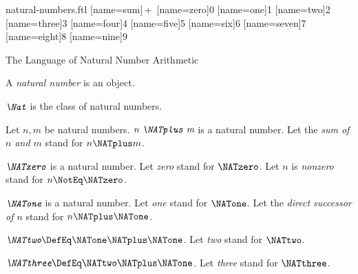 \documentclass{stex}
\begin{document}
\begin{smodule}{natural-numbers.ftl}
[name=sum]{\,+\,}
[name=zero]{0}
[name=one]{1}
[name=two]{2}
[name=three]{3}
[name=four]{4}
[name=five]{5}
[name=six]{6}
[name=seven]{7}
[name=eight]{8}
[name=nine]{9}

\begin{sfragment}{The Language of Natural Number Arithmetic}
  \begin{signature}[forthel,for=natural number]
    A \emph{natural number} is an object.
  \end{signature}

  \begin{definition}[forthel,for=Nat]
    $\emph{\Nat}$ is the class of natural numbers.
  \end{definition}

  \begin{signature}[forthel,for=sum]
    Let $n, m$ be natural numbers.
    $\emph{n \NATplus m}$ is a natural number.
    Let the \emph{sum of $n$ and $m$} stand for $n \NATplus m$.
  \end{signature}

  \begin{signature}[forthel,for={zero,nonzero}]
    $\emph{\NATzero}$ is a natural number.
    Let \emph{zero} stand for $\NATzero$.
    Let $n$ is \emph{nonzero} stand for $n \NotEq \NATzero$.
  \end{signature}

  \begin{signature}[forthel,for={one,direct successor}]
    $\emph{\NATone}$ is a natural number.
    Let \emph{one} stand for $\NATone$.
    Let the \emph{direct successor of $n$} stand for $n \NATplus \NATone$.
  \end{signature}

  \begin{definition}[forthel,for=two]
    $\emph{\NATtwo} \DefEq \NATone \NATplus \NATone$.
    Let \emph{two} stand for $\NATtwo$.
  \end{definition}

  \begin{definition}[forthel,for=three]
    $\emph{\NATthree} \DefEq \NATtwo \NATplus \NATone$.
    Let \emph{three} stand for $\NATthree$.
  \end{definition}


\end{sfragment}
\end{smodule}
\end{document}

